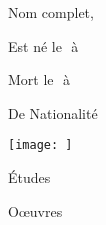 \documentclass[12pt,a4paper]{article}
\begin{document}
\begin{cursive}
\begin{center}
        \shadowbox{\begin{large}
                \textcolor{black}{}
        \end{large}}
    \end{center}
    \vspace{0.5 cm}
\setlength{\columnseprule}{0.25pt}
\begin{multicols}{2}
 Nom complet,
\vspace{0.1 cm} \\ 
\par
{} \par
{} Est né le $ $ à  \par
{} Mort le $ $ à \par
{} De Nationalité \par
\centering

\texttt{[image: ]}
\end{multicols}
\dotfill
\begin{center}
 \'Etudes\par
\end{center}

 \par
{} \par
{} \par
{} \par
{} \par
{} \par
{} \par

\begin{center}
 O\oe uvres \par
\end{center}


 \par
{} \par
{} \par

\end{cursive}
\end{document}
